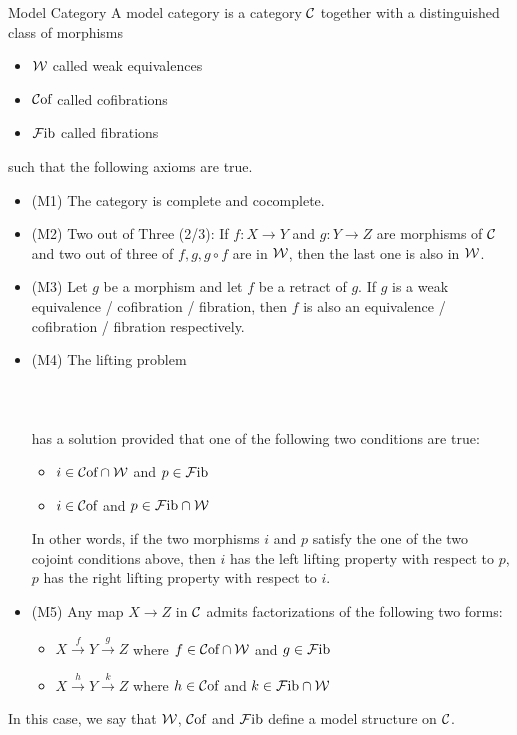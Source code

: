 \documentclass[a4paper]{article}
\begin{document}
\begin{defn}{Model Category}{} A model category is a category $\mathcal{C}$ together with a distinguished class of morphisms
\begin{itemize}
\item $\mathcal{W}$ called weak equivalences
\item $\mathcal{C}\text{of}$ called cofibrations
\item $\mathcal{F}\text{ib}$ called fibrations
\end{itemize}
such that the following axioms are true. 
\begin{itemize}
\item (M1) The category is complete and cocomplete. 
\item (M2) Two out of Three (2/3): If $f:X\to Y$ and $g:Y\to Z$ are morphisms of $\mathcal{C}$ and two out of three of $f,g,g\circ f$ are in $\mathcal{W}$, then the last one is also in $\mathcal{W}$. 
\item (M3) Let $g$ be a morphism and let $f$ be a retract of $g$. If $g$ is a weak equivalence / cofibration / fibration, then $f$ is also an equivalence / cofibration / fibration respectively. 
\item (M4) The lifting problem \\~\\
\\~\\
has a solution provided that one of the following two conditions are true: 
\begin{itemize}
\item $i\in\mathcal{C}\text{of}\cap\mathcal{W}$ and $p\in\mathcal{F}\text{ib}$
\item $i\in\mathcal{C}\text{of}$ and $p\in\mathcal{F}\text{ib}\cap\mathcal{W}$
\end{itemize}
In other words, if the two morphisms $i$ and $p$ satisfy the one of the two cojoint conditions above, then $i$ has the left lifting property with respect to $p$, $p$ has the right lifting property with respect to $i$. 
\item (M5) Any map $X\to Z$ in $\mathcal{C}$ admits factorizations of the following two forms: 
\begin{itemize}
\item $X\overset{f}{\longrightarrow}Y\overset{g}{\longrightarrow}Z$ where $f\in\mathcal{C}\text{of}\cap\mathcal{W}$ and $g\in\mathcal{F}\text{ib}$
\item $X\overset{h}{\longrightarrow}Y\overset{k}{\longrightarrow}Z$ where $h\in\mathcal{C}\text{of}$ and $k\in\mathcal{F}\text{ib}\cap\mathcal{W}$
\end{itemize}
\end{itemize}
In this case, we say that $\mathcal{W}$, $\mathcal{C}\text{of}$ and $\mathcal{F}\text{ib}$ define a model structure on $\mathcal{C}$. 
\end{defn}
\end{document}
